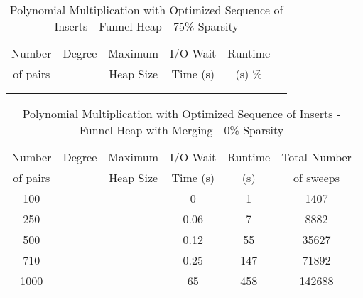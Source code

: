 \documentclass[11pt, one-sided]{amsart}
\begin{document}
\begin{table}[htbp]
   \centering
      \caption{Polynomial Multiplication with Optimized Sequence of Inserts - Funnel Heap - 75\% Sparsity}
   \begin{tabular}{|c|c|c|c|c|c|}
   	\hline
		 Number   & 	Degree	& Maximum & I/O Wait		& Runtime 	 \\ 
		 of pairs 	&			& Heap Size	& Time (s)		&	(s)		 		\%				\\ \hline
		 		&			&			&			&						\\
		 		&			&			&			&						\\
   \end{tabular}
   \label{tab:booktabs}
\end{table}



\newpage


\begin{table}[htbp]
   \centering
      \caption{Polynomial Multiplication with Optimized Sequence of Inserts - Funnel Heap with Merging - 0\% Sparsity}
   \begin{tabular}{|c|c|c|c|c|c|}
   	\hline
		 Number   & 	Degree	& Maximum 	& I/O Wait		&  Runtime 	& Total Number		 \\ 
		 of pairs 	&			& Heap Size	& Time (s)		&	(s)	 	& of sweeps			\\ \hline
		 100		&			&			&	0		&	1		&	1407				\\
		 250		&			&			&	0.06		&	7		&	8882				\\
		 500		&			&			&	0.12		&	55		&	35627			\\
		 710		&			&			&	0.25		&	147		&	71892			\\
		1000		&			&			&	65		&	458		&	142688			\\
	\hline
   \end{tabular}
   \label{tab:booktabs}
\end{table}
\end{document}
